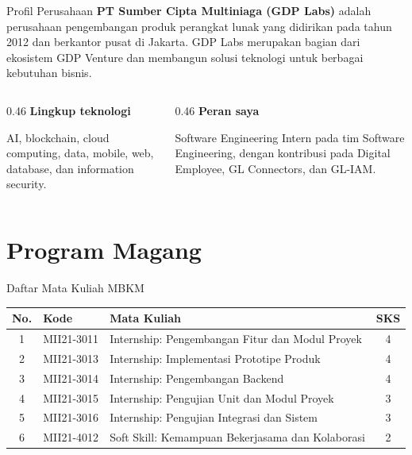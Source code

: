 \begin{contentframe}{Profil Perusahaan}
    \small
    \textbf{PT Sumber Cipta Multiniaga (GDP Labs)} adalah perusahaan pengembangan produk perangkat lunak yang didirikan pada tahun 2012 dan berkantor pusat di Jakarta. GDP Labs merupakan bagian dari ekosistem GDP Venture dan membangun solusi teknologi untuk berbagai kebutuhan bisnis.

    \vspace{0.22cm}
    \begin{columns}[T,onlytextwidth]
        \begin{column}{0.46\textwidth}
            \textbf{Lingkup teknologi}\par
            AI, blockchain, cloud computing, data, mobile, web, database, dan information security.
        \end{column}
        \begin{column}{0.46\textwidth}
            \textbf{Peran saya}\par
            Software Engineering Intern pada tim Software Engineering, dengan kontribusi pada Digital Employee, GL Connectors, dan GL-IAM.
        \end{column}
    \end{columns}
\end{contentframe}

\section{Program Magang}
\begin{frame}[plain]\sectionpage\end{frame}

\begin{contentframe}{Daftar Mata Kuliah MBKM}
    \centering
    \scriptsize
    \begin{tabular}{@{}clp{}c@{}}
        \toprule
        \textbf{No.} & \textbf{Kode} & \textbf{Mata Kuliah} & \textbf{SKS} \\
        \midrule
        1 & MII21-3011 & Internship: Pengembangan Fitur dan Modul Proyek & 4 \\
        2 & MII21-3013 & Internship: Implementasi Prototipe Produk & 4 \\
        3 & MII21-3014 & Internship: Pengembangan Backend & 4 \\
        4 & MII21-3015 & Internship: Pengujian Unit dan Modul Proyek & 3 \\
        5 & MII21-3016 & Internship: Pengujian Integrasi dan Sistem & 3 \\
        6 & MII21-4012 & Soft Skill: Kemampuan Bekerjasama dan Kolaborasi & 2 \\
        \bottomrule
    \end{tabular}
    \vspace{0.22cm}

\end{contentframe}


